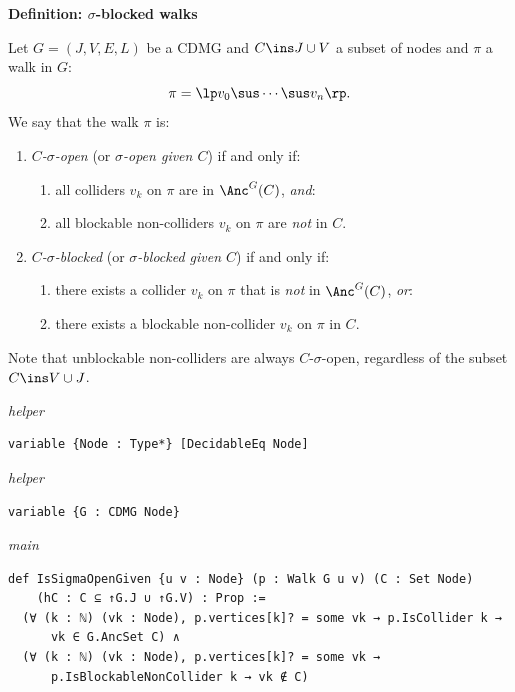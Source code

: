 \noindent\textbf{Definition: $\sigma$-blocked walks}\par\smallskip
{\appendixTexSize
\label{def:sigma_blocking}
  Let $G=(J,V,E,L)$ be a CDMG and $C \ins J \cup V$ a subset of nodes and $\pi$ a walk in $G$:
  \[ \pi =\lp  v_0 \sus \cdots \sus v_n \rp.  \]
  We say that the walk $\pi$ is:
  \begin{enumerate}
    \item   \emph{$C$-$\sigma$-open} (or \emph{$\sigma$-open given $C$}) if and only if:
  \begin{enumerate}[label=\roman*.)]
      \item all colliders $v_k$ on $\pi$ are in $\Anc^G(C)$, \emph{and}:
    \item all blockable non-colliders $v_k$ on $\pi$ are \emph{not} in $C$.
  \end{enumerate}
      \item   \emph{$C$-$\sigma$-blocked}  (or \emph{$\sigma$-blocked given $C$}) if and only if:
  \begin{enumerate}[label=\roman*.)]
    \item there exists a collider $v_k$ on $\pi$ that is \emph{not} in $\Anc^G(C)$, \emph{or}:
    \item there exists a blockable non-collider $v_k$ on $\pi$ in $C$.
  \end{enumerate}  \end{enumerate}
  \begin{claimmark}
  Note that unblockable non-colliders are always $C$-$\sigma$-open, regardless of the subset $C \ins V \cup J$.
  \end{claimmark}
\par}
\smallskip
{\small\textit{helper}}
\begin{verbatim}
variable {Node : Type*} [DecidableEq Node]
\end{verbatim}
{\small\textit{helper}}
\begin{verbatim}
variable {G : CDMG Node}
\end{verbatim}
{\small\textit{main}}
\begin{verbatim}
def IsSigmaOpenGiven {u v : Node} (p : Walk G u v) (C : Set Node)
    (hC : C ⊆ ↑G.J ∪ ↑G.V) : Prop :=
  (∀ (k : ℕ) (vk : Node), p.vertices[k]? = some vk → p.IsCollider k →
      vk ∈ G.AncSet C) ∧
  (∀ (k : ℕ) (vk : Node), p.vertices[k]? = some vk →
      p.IsBlockableNonCollider k → vk ∉ C)
\end{verbatim}
